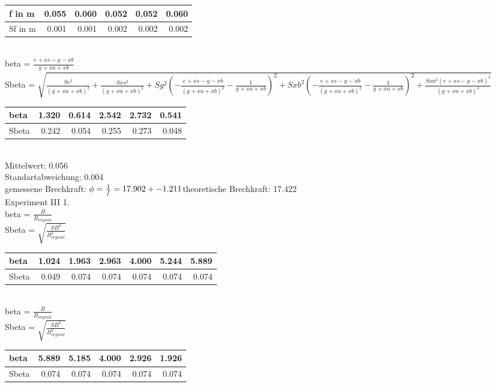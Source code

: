 	\begin{tabular}{| l | r|r|r|r|r|}
	\hline
        f in m& 0.055 & 0.060 & 0.052 & 0.052 & 0.060 \\ \hline Sf in m& 0.001 & 0.001 & 0.002 & 0.002 & 0.002 \\ \hline
	\end{tabular} \\ \bigskip \vspace{3 mm}  beta = $\frac{e_{} + xs - g_{} - xb}{g_{} + xa + xb}$\\Sbeta = $\sqrt{\frac{Se_{}^{2}}{\left(g_{} + xa + xb\right)^{2}} + \frac{Sxs^{2}}{\left(g_{} + xa + xb\right)^{2}} + Sg_{}^{2} \left(- \frac{e_{} + xs - g_{} - xb}{\left(g_{} + xa + xb\right)^{2}} - \frac{1}{g_{} + xa + xb}\right)^{2} + Sxb^{2} \left(- \frac{e_{} + xs - g_{} - xb}{\left(g_{} + xa + xb\right)^{2}} - \frac{1}{g_{} + xa + xb}\right)^{2} + \frac{Sxa^{2} \left(e_{} + xs - g_{} - xb\right)^{2}}{\left(g_{} + xa + xb\right)^{4}}}$\\\normalsize \vspace{3 mm}
	\begin{tabular}{| l | r|r|r|r|r|}
	\hline
        beta& 1.320 & 0.614 & 2.542 & 2.732 & 0.541 \\ \hline Sbeta& 0.242 & 0.054 & 0.255 & 0.273 & 0.048 \\ \hline
	\end{tabular} \\ \bigskip Mittelwert: 0.056\\Standartabweichung: 0.004\\gemessene Brechkraft: $\phi=\frac{1}{f}=17.902 +- 1.211\\ $theoretische Brechkraft: 17.422\\ Experiment III 1.\\ \vspace{3 mm}  beta = $\frac{B}{B_{orginal}}$\\Sbeta = $\sqrt{\frac{SB^{2}}{B_{orginal}^{2}}}$\\\normalsize \vspace{3 mm}
	\begin{tabular}{| l | r|r|r|r|r|r|}
	\hline
        beta& 1.024 & 1.963 & 2.963 & 4.000 & 5.244 & 5.889 \\ \hline Sbeta& 0.049 & 0.074 & 0.074 & 0.074 & 0.074 & 0.074 \\ \hline
	\end{tabular} \\ \bigskip \vspace{3 mm}  beta = $\frac{B}{B_{orginal}}$\\Sbeta = $\sqrt{\frac{SB^{2}}{B_{orginal}^{2}}}$\\\normalsize \vspace{3 mm}
	\begin{tabular}{| l | r|r|r|r|r|}
	\hline
        beta& 5.889 & 5.185 & 4.000 & 2.926 & 1.926 \\ \hline Sbeta& 0.074 & 0.074 & 0.074 & 0.074 & 0.074 \\ \hline
	\end{tabular} \\ \bigskip 